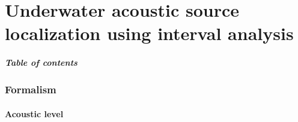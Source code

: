 \documentclass[9pt, xcolor={usenames, dvipsnames}]{beamer}
\begin{document}
	\part{Underwater acoustic source localization using interval analysis}

		\begin{frame}
			\partpage
		\end{frame}

		\begin{frame}
			\frametitle{Table of contents}
			\tableofcontents%
		\end{frame}

		\section{Formalism}

			\subsection{Acoustic level}
\end{document}
